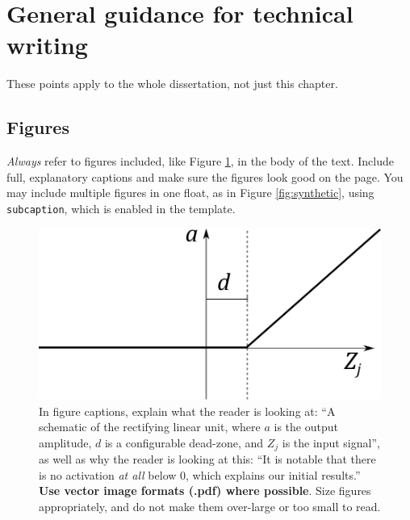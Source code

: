 \documentclass{l4proj}
\begin{document}
\section{General guidance for technical writing}

These points apply to the whole dissertation, not just this chapter.

\subsection{Figures}
\emph{Always} refer to figures included, like Figure \ref{fig:relu}, in the body of the text. Include full, explanatory captions and make sure the figures look good on the page.
You may include multiple figures in one float, as in Figure \ref{fig:synthetic}, using \texttt{subcaption}, which is enabled in the template.


\begin{figure}[htb]
    \centering
    \includegraphics[width=0.5\linewidth]{images/relu.pdf}    

    \caption{In figure captions, explain what the reader is looking at: ``A schematic of the rectifying linear unit, where $a$ is the output amplitude,
    $d$ is a configurable dead-zone, and $Z_j$ is the input signal'', as well as why the reader is looking at this: 
    ``It is notable that there is no activation \emph{at all} below 0, which explains our initial results.'' 
    \textbf{Use vector image formats (.pdf) where possible}. Size figures appropriately, and do not make them over-large or too small to read.
    }

    \label{fig:relu} 
\end{figure}
\end{document}
